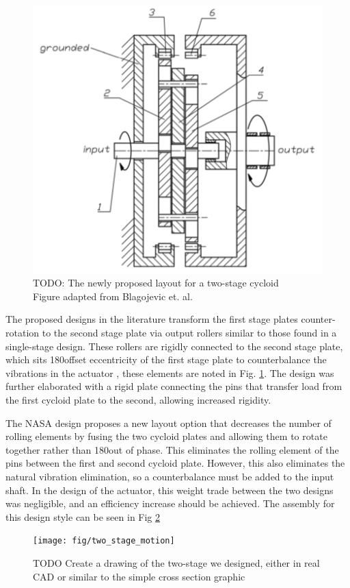\begin{figure}[h]
	\centering
	\includegraphics[width=0.48\linewidth]{fig/new_layout_TODO}
   \caption{TODO: The newly proposed layout for a two-stage cycloid
   \\ Figure adapted from Blagojevic et. al. \cite{ref:new_two_stage}}
   \label{fig:two_stage_simple_cross}
\end{figure}

The proposed designs in the literature transform the first stage plates counter-rotation to the second stage plate via output rollers similar to those found in a single-stage design. These rollers are rigidly connected to the second stage plate, which sits 180\textdegree offset eccentricity of the first stage plate to counterbalance the vibrations in the actuator \cite{ref:new_two_stage}, these elements are noted in Fig. \ref{fig:two_stage_simple_cross}. The design was further elaborated with a rigid plate connecting the pins that transfer load from the first cycloid plate to the second, allowing increased rigidity. 

The NASA design proposes a new layout option that decreases the number of rolling elements by fusing the two cycloid plates and allowing them to rotate together rather than 180\textdegree out of phase. This eliminates the rolling element of the pins between the first and second cycloid plate. However, this also eliminates the natural vibration elimination, so a counterbalance must be added to the input shaft. In the design of the actuator, this weight trade between the two designs was negligible, and an efficiency increase should be achieved. The assembly for this design style can be seen in Fig \ref{fig:two_stage_design} 

\begin{figure}[h]
	\centering
	\texttt{[image: fig/two\_stage\_motion]}
   \caption{TODO Create a drawing of the two-stage we designed, either in real CAD or similar to the simple cross section graphic}
   \label{fig:two_stage_design}
\end{figure}


